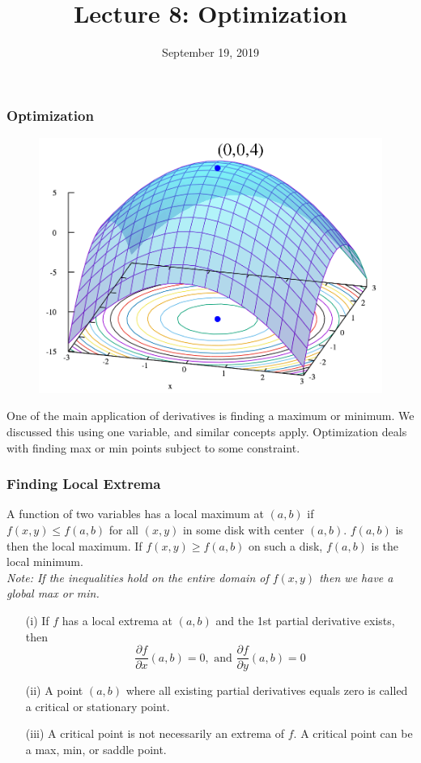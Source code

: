 \documentclass{beamer}
\title{Lecture 8: Optimization}
\date{September 19, 2019}
\begin{document}
	
\frame{\titlepage}


\begin{frame}
\frametitle{Optimization}
\begin{figure}
	\centering
	\includegraphics[height=.5\textheight]{maxpoint.png}\\
	\hspace*{10pt}\hbox{}
\end{figure}

One of the main application of derivatives is finding a maximum or minimum. We discussed this using one variable, and similar concepts apply. Optimization deals with finding max or min points subject to some constraint.
\end{frame}


\begin{frame}
\frametitle{Finding Local Extrema}
A function of two variables has a local maximum at $(a,b)$ if $f(x,y) \leq f(a,b)$ for all $(x,y)$ in some disk with center $(a,b)$. $f(a,b)$ is then the local maximum. If $f(x,y) \geq f(a,b)$ on such a disk, $f(a,b)$ is the local minimum.\\
\textit{Note: If the inequalities hold on the entire domain of $f(x,y)$ then we have a global max or min.}
\begin{itemize}
	\item[(i)] If $f$ has a local extrema at $(a,b)$ and the 1st partial derivative exists, then 
	$$\frac{\partial f}{\partial x} (a,b) = 0, \mbox{ and } \frac{\partial f}{\partial y} (a,b) = 0$$
	\item[(ii)] A point $(a,b)$ where all existing partial derivatives equals zero is called a critical or stationary point.
	\item[(iii)] A critical point is not necessarily an extrema of $f$. A critical point can be a max, min, or saddle point.
\end{itemize}
 

\end{frame}
\end{document}
